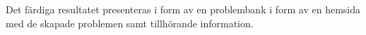 \textcolor{lila}{Det färdiga resultatet presenteras i form av en problembank i form av en hemsida med de skapade problemen samt tillhörande information.} 